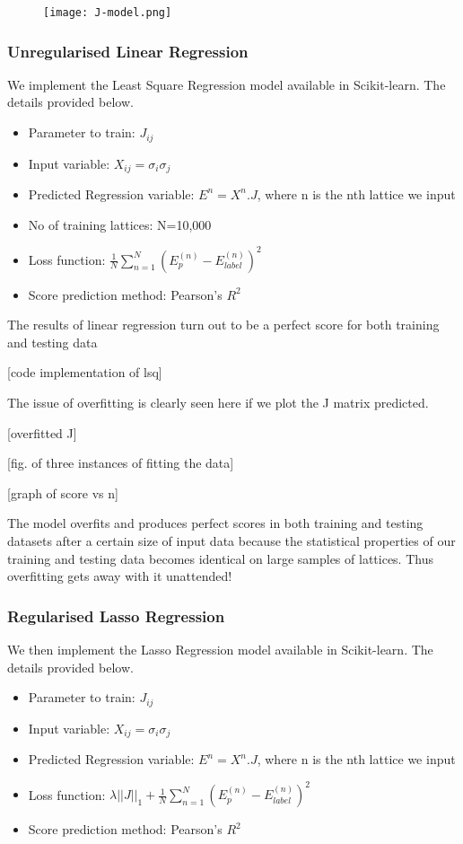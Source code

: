 \begin{figure}
    \centering
    \texttt{[image: J-model.png]}
    \label{J matrix for nearest neighbour interaction}
\end{figure}

\subsubsection{Unregularised Linear Regression}
We implement the Least Square Regression model available in Scikit-learn. The details provided below.
\begin{itemize}
    \item Parameter to train: \(J_{ij}\)
    \item Input variable: \(X_{ij}=\sigma_i\sigma_j\)
    \item Predicted Regression variable: \(E^n=X^n.J\), where n is the nth lattice we input
    \item No of training lattices: N=10,000
    \item Loss function: \(\frac{1}{N} \sum_{n=1}^N(E_p^{(n)}-E_{label}^{(n)})^2\)
    \item Score prediction method: Pearson's \(R^2\)
\end{itemize}

The results of linear regression turn out to be a perfect score for both training and testing data

[code implementation of lsq]

The issue of overfitting is clearly seen here if we plot the J matrix predicted.

[overfitted J]

[fig. of three instances of fitting the data]

[graph of score vs n]

The model overfits and produces perfect scores in both training and testing datasets after a certain size of input data because the statistical properties of our training and testing data becomes identical on large samples of lattices. Thus overfitting gets away with it unattended!

\subsubsection{Regularised Lasso Regression}
We then implement the Lasso Regression model available in Scikit-learn. The details provided below.
\begin{itemize}
    \item Parameter to train: \(J_{ij}\)
    \item Input variable: \(X_{ij}=\sigma_i\sigma_j\)
    \item Predicted Regression variable: \(E^n=X^n.J\), where n is the nth lattice we input
    \item Loss function: \(\lambda ||J||_1 + \frac{1}{N} \sum_{n=1}^N(E_p^{(n)}-E_{label}^{(n)})^2\)
    \item Score prediction method: Pearson's \(R^2\)
\end{itemize}


